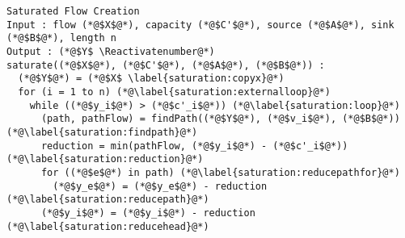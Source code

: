 {}
\Suppressnumber
\begin{lstlisting}[label=saturationcode, style=numbers]
Saturated Flow Creation
Input : flow (*@$X$@*), capacity (*@$C'$@*), source (*@$A$@*), sink (*@$B$@*), length n
Output : (*@$Y$ \Reactivatenumber@*)
saturate((*@$X$@*), (*@$C'$@*), (*@$A$@*), (*@$B$@*)) :
  (*@$Y$@*) = (*@$X$ \label{saturation:copyx}@*)
  for (i = 1 to n) (*@\label{saturation:externalloop}@*)
    while ((*@$y_i$@*) > (*@$c'_i$@*)) (*@\label{saturation:loop}@*)
      (path, pathFlow) = findPath((*@$Y$@*), (*@$v_i$@*), (*@$B$@*)) (*@\label{saturation:findpath}@*)
      reduction = min(pathFlow, (*@$y_i$@*) - (*@$c'_i$@*)) (*@\label{saturation:reduction}@*)
      for ((*@$e$@*) in path) (*@\label{saturation:reducepathfor}@*)
        (*@$y_e$@*) = (*@$y_e$@*) - reduction (*@\label{saturation:reducepath}@*)
      (*@$y_i$@*) = (*@$y_i$@*) - reduction (*@\label{saturation:reducehead}@*)
\end{lstlisting}
